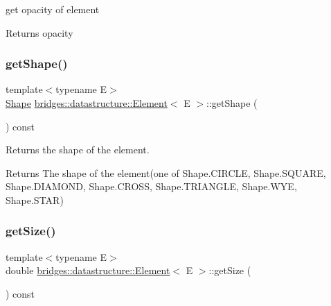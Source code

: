 get opacity of element

\begin{DoxyReturn}{Returns}
opacity 
\end{DoxyReturn}
\mbox{\label{classbridges_1_1datastructure_1_1_element_acb8680aa406733d36411fd189017706c}} 
\subsubsection{\texorpdfstring{get\+Shape()}{getShape()}}
{\footnotesize\ttfamily template$<$typename E$>$ \\
\hyperlink{namespacebridges_1_1datastructure_a3408f5f44d9c6062e5f3adb7e1bbb7f0}{Shape} \hyperlink{classbridges_1_1datastructure_1_1_element}{bridges\+::datastructure\+::\+Element}$<$ E $>$\+::get\+Shape (\begin{DoxyParamCaption}{ }\end{DoxyParamCaption}) const\hspace{0.3cm}{\ttfamily [inline]}}



Returns the shape of the element. 

\begin{DoxyReturn}{Returns}
The shape of the element(one of Shape.\+C\+I\+R\+C\+LE, Shape.\+S\+Q\+U\+A\+RE, Shape.\+D\+I\+A\+M\+O\+ND, Shape.\+C\+R\+O\+SS, Shape.\+T\+R\+I\+A\+N\+G\+LE, Shape.\+W\+YE, Shape.\+S\+T\+AR) 
\end{DoxyReturn}
\mbox{\label{classbridges_1_1datastructure_1_1_element_a8c0b15450978b03c8ebf6a3c23092cba}} 
\subsubsection{\texorpdfstring{get\+Size()}{getSize()}}
{\footnotesize\ttfamily template$<$typename E$>$ \\
double \hyperlink{classbridges_1_1datastructure_1_1_element}{bridges\+::datastructure\+::\+Element}$<$ E $>$\+::get\+Size (\begin{DoxyParamCaption}{ }\end{DoxyParamCaption}) const\hspace{0.3cm}{\ttfamily [inline]}}




